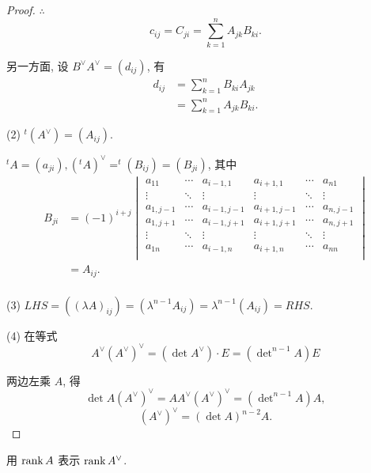 \documentclass{ctexart}
\begin{document}
\begin{proof}
    $\therefore$
    \[c_{ij}=C_{ji}=\sum\limits_{k=1}^nA_{jk}B_{ki}.\]

    另一方面, 设 $B^\vee A^\vee=(d_{ij})$, 有
    \begin{align*}
        d_{ij} & =\sum\limits_{k=1}^nB_{ki}A_{jk} \\
        & =\sum\limits_{k=1}^nA_{jk}B_{ki}.
    \end{align*}

    (2) $^t(A^\vee)=(A_{ij})$.

    $^tA=(a_{ji}),(^tA)^\vee=^t(B_{ij})=(B_{ji})$, 其中
    \begin{align*}
        B_{ji} & =(-1)^{i+j}\begin{vmatrix}
            a_{11} & \cdots & a_{i-1,1} & a_{i+1,1} & \cdots & a_{n1} \\
            \vdots & \ddots & \vdots & \vdots & \ddots & \vdots \\
            a_{1,j-1} & \cdots & a_{i-1,j-1} & a_{i+1,j-1} & \cdots & a_{n,j-1} \\
            a_{1,j+1} & \cdots & a_{i-1,j+1} & a_{i+1,j+1} & \cdots & a_{n,j+1} \\
            \vdots & \ddots & \vdots & \vdots & \ddots & \vdots \\
            a_{1n} & \cdots & a_{i-1,n} & a_{i+1,n} & \cdots & a_{nn} \\
        \end{vmatrix} \\
        & =A_{ij}. \\
    \end{align*}

    (3) $LHS=((\lambda A)_{ij})=(\lambda^{n-1}A_{ij})=\lambda^{n-1}(A_{ij})=RHS$.

    (4) 在等式
    \[A^\vee(A^\vee)^\vee=(\det A^\vee)\cdot E=(\det\nolimits^{n-1}A)E\]

    两边左乘 $A$, 得
    \[\det A(A^\vee)^\vee=AA^\vee(A^\vee)^\vee=(\det\nolimits^{n-1}A)A,\]
    \[(A^\vee)^\vee=(\det A)^{n-2}A.\]
\end{proof}
\begin{exercise}%
    用 $\operatorname{rank} A$ 表示 $\operatorname{rank} A^\vee$.
\end{exercise}
\end{document}
